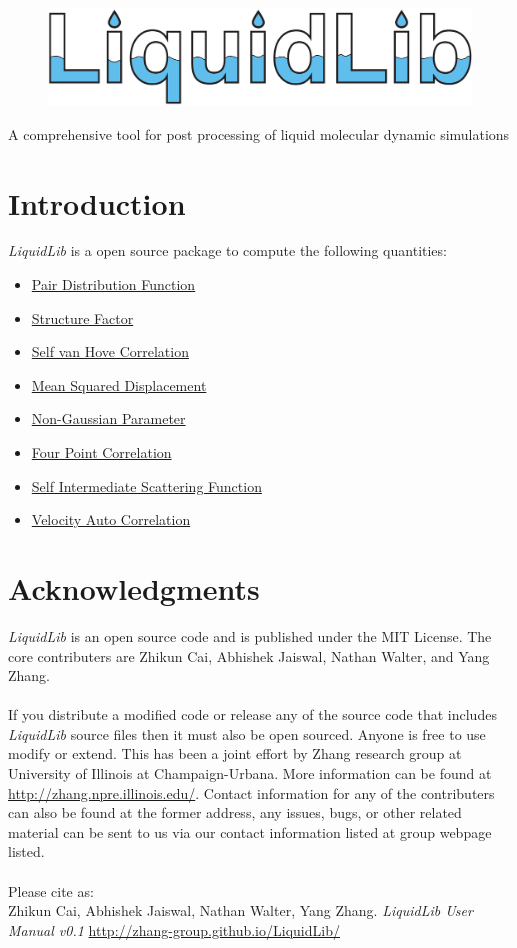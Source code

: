 \documentclass{article}
\begin{document}
	\begin{figure}
		\centering
		\includegraphics[width=.9\textwidth]{./images/LiquidLib_logo.pdf}
	\end{figure}
{
\centering
\Large A comprehensive tool for post processing of liquid molecular dynamic simulations
}
\newpage

\section{Introduction}
\textit{LiquidLib} is a open source package to compute the following quantities:
\begin{itemize}
	\item \hyperref[sec::gofr]{Pair Distribution Function}
	\item \hyperref[sec::sofk]{Structure Factor}
	\item \hyperref[sec::Gofrt]{Self van Hove Correlation}
	\item \hyperref[sec::MSD]{Mean Squared Displacement}
	\item \hyperref[sec::alpha2]{Non-Gaussian Parameter}
	\item \hyperref[sec::chi4]{Four Point Correlation}
	\item \hyperref[sec::Fsqt]{Self Intermediate Scattering Function}
	\item \hyperref[sec::VACF]{Velocity Auto Correlation}
\end{itemize}

\section{Acknowledgments}
\textit{LiquidLib} is an open source code and is published under the MIT License.  The core contributers are Zhikun Cai, Abhishek Jaiswal, Nathan Walter, and Yang Zhang.   
\\
\\
If you distribute a modified code or release any of the source code that includes \textit{LiquidLib} source files then it must also be open sourced.  Anyone is free to use modify or extend.  This has been a joint effort by Zhang research group at University of Illinois at Champaign-Urbana.  More information can be found at \url{http://zhang.npre.illinois.edu/}.  Contact information for any of the contributers can also be found at the former address, any issues, bugs, or other related material can be sent to us via our contact information listed at group webpage listed.
\\
\\
Please cite as:\\
\hspace*{1cm}Zhikun Cai, Abhishek Jaiswal, Nathan Walter, Yang Zhang. \textit{LiquidLib User Manual v0.1} \url{http://zhang-group.github.io/LiquidLib/} 
\end{document}
